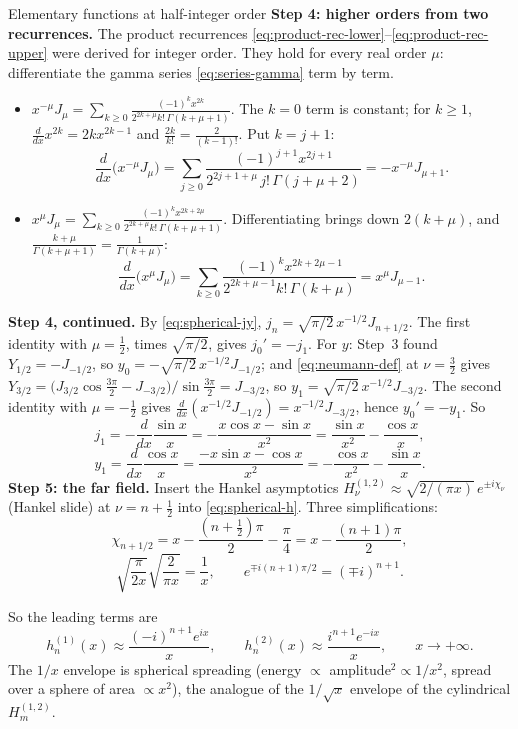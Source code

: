 \documentclass[11pt]{beamer}
\begin{document}
\begin{frame}[allowframebreaks=1.00]{Elementary functions at half-integer order}
\textbf{Step 4: higher orders from two recurrences.} The product recurrences
\eqref{eq:product-rec-lower}--\eqref{eq:product-rec-upper} were derived for integer order. They hold for every
real order \(\mu\): differentiate the gamma series \eqref{eq:series-gamma} term by term.
\begin{itemize}
  \item \(x^{-\mu}J_\mu=\sum_{k\ge0}\frac{(-1)^kx^{2k}}{2^{2k+\mu}k!\,\Gamma(k+\mu+1)}\). The \(k=0\) term is constant; for \(k\ge1\),
        \(\frac{d}{dx}x^{2k}=2kx^{2k-1}\) and \(\frac{2k}{k!}=\frac{2}{(k-1)!}\). Put \(k=j+1\):
        \[
         \frac{d}{dx}\bigl(x^{-\mu}J_\mu\bigr)=\sum_{j\ge0}\frac{(-1)^{j+1}x^{2j+1}}{2^{2j+1+\mu}\,j!\,\Gamma(j+\mu+2)}=-x^{-\mu}J_{\mu+1}.
        \]
  \item \(x^{\mu}J_\mu=\sum_{k\ge0}\frac{(-1)^kx^{2k+2\mu}}{2^{2k+\mu}k!\,\Gamma(k+\mu+1)}\). Differentiating brings down \(2(k+\mu)\), and
        \(\frac{k+\mu}{\Gamma(k+\mu+1)}=\frac1{\Gamma(k+\mu)}\):
        \[
         \frac{d}{dx}\bigl(x^{\mu}J_\mu\bigr)=\sum_{k\ge0}\frac{(-1)^kx^{2k+2\mu-1}}{2^{2k+\mu-1}k!\,\Gamma(k+\mu)}=x^{\mu}J_{\mu-1}.
        \]
\end{itemize}


\textbf{Step 4, continued.} By \eqref{eq:spherical-jy}, \(j_n=\sqrt{\pi/2}\,x^{-1/2}J_{n+1/2}\). The first identity with
\(\mu=\frac12\), times \(\sqrt{\pi/2}\), gives \(j_0'=-j_1\). For \(y\): Step~3 found \(Y_{1/2}=-J_{-1/2}\), so
\(y_0=-\sqrt{\pi/2}\,x^{-1/2}J_{-1/2}\); and \eqref{eq:neumann-def} at \(\nu=\frac32\) gives
\(Y_{3/2}=\bigl(J_{3/2}\cos\frac{3\pi}2-J_{-3/2}\bigr)/\sin\frac{3\pi}2=J_{-3/2}\), so \(y_1=\sqrt{\pi/2}\,x^{-1/2}J_{-3/2}\). The second
identity with \(\mu=-\frac12\) gives \(\frac{d}{dx}(x^{-1/2}J_{-1/2})=x^{-1/2}J_{-3/2}\), hence \(y_0'=-y_1\). So
\[
 j_1=-\frac{d}{dx}\frac{\sin x}{x}=-\frac{x\cos x-\sin x}{x^2}=\frac{\sin x}{x^2}-\frac{\cos x}{x},
\]
\[
 y_1=\frac{d}{dx}\frac{\cos x}{x}=\frac{-x\sin x-\cos x}{x^2}=-\frac{\cos x}{x^2}-\frac{\sin x}{x}.
\]
\textbf{Step 5: the far field.} Insert the Hankel asymptotics \(H^{(1,2)}_\nu\approx\sqrt{2/(\pi x)}\,e^{\pm i\chi_\nu}\) (Hankel
slide) at \(\nu=n+\frac12\) into \eqref{eq:spherical-h}. Three simplifications:
\[
 \chi_{n+1/2}=x-\frac{(n+\frac12)\pi}2-\frac\pi4=x-\frac{(n+1)\pi}{2},
\]
\[
 \sqrt{\frac{\pi}{2x}}\sqrt{\frac{2}{\pi x}}=\frac1x,\qquad
 e^{\mp i(n+1)\pi/2}=(\mp i)^{n+1}.
\]


So the leading terms are
\begin{equation}
 h_n^{(1)}(x)\approx\frac{(-i)^{n+1}e^{ix}}{x},\qquad
 h_n^{(2)}(x)\approx\frac{i^{n+1}e^{-ix}}{x},\qquad x\to+\infty.
 \label{eq:spherical-h-far}
\end{equation}
The \(1/x\) envelope is spherical spreading (energy \(\propto\) amplitude\(^2\propto1/x^2\), spread over a sphere of
area \(\propto x^2\)), the analogue of the \(1/\sqrt x\) envelope of the cylindrical \(H_m^{(1,2)}\).


\end{frame}
\end{document}
